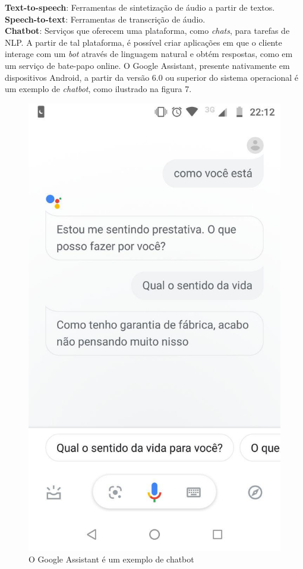\documentclass{article}
\begin{document}
\textbf{Text-to-speech}: Ferramentas de sintetização de áudio a partir de textos. \\
\textbf{Speech-to-text}: Ferramentas de transcrição de áudio. \\
\textbf{Chatbot}: Serviços que oferecem uma plataforma, como \textit{chats}, para tarefas de NLP. A partir de tal plataforma, é possível criar aplicações em que o cliente interage com um \textit{bot} através de linguagem natural e obtém respostas, como em um serviço de bate-papo online. O Google Assistant, presente nativamente em dispositivos Android, a partir da versão 6.0 ou superior do sistema operacional é um exemplo de \textit{chatbot}, como ilustrado na figura 7.\\
\begin{figure}[H]
    \centering
    \includegraphics[scale=0.3]{imagens/chatbot.jpg}
    \caption{O Google Assistant é um exemplo de chatbot}
    \label{fig:chatbot}
\end{figure}{}
\end{document}
